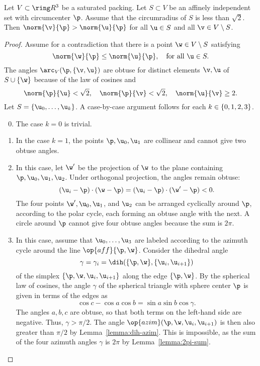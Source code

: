 \begin{cnl}
\figNOCHOTB %


\begin{lemma}[nondegeneracy]
\label{lemma:sqrt2-close} 
%
Let $V\subset\vecR{3}$ be a saturated packing.  Let $S\subset V$ be an
affinely independent set with circumcenter $\p$.  Assume that the
circumradius of $S$ is less than $\sqrt2$.  Then
$\norm{\v}{\p}>\norm{\u}{\p}$ for all $\u\in S$ and all $\v\in
V\setminus S$.
\end{lemma}


\begin{proof} 
Assume for a contradiction that 
there is a point $\w\in V\setminus S$ satisfying
\begin{equation}\label{eqn:closest} 
\norm{\w}{\p}\le \norm{ \u}{\p}, \quad\text{for all }  \u\in S.
\end{equation}
The angles $\arc_V(\p,\braced{\v, \u})$ are obtuse for distinct elements
$\v,\u$ of $ S\cup\braced{\w}$ because of the law of cosines and
\[  
\norm{\p}{\u} < \sqrt2,\quad \norm{\p}{ \v} <\sqrt2,\quad \norm{\u}{ \v} \ge 2.
\]  
Let $S=\setenumdots{\u}{0}{k}$.
A case-by-case argument follows for each $k\in\{0,1,2,3\}$.

\begin{enumerate}
\setcounter{enumi}{-1}
\item 
The case $k=0$ is trivial.
\item
  In the case $k=1$, the points $\p, \u_0, \u_1$ are collinear and
  cannot give two obtuse angles.
\item
In this case, let $\w'$ be the projection of $\w$ to
the plane containing $\p, \u_0, \u_1, \u_2$.  Under orthogonal
projection, the angles remain obtuse:
\[
(\u_i-\p)\cdot (\w-\p) = (\u_i-\p)\cdot (\w'-\p) <0.
\] 
The four points $\w', \u_0, \u_1$, and $\u_2$ can be arranged
cyclically around $\p$, according to the polar cycle, each forming an
obtuse angle with the next.  A circle around $\p$ cannot give four
obtuse angles because the sum is $2\pi$.
\item
In this case, assume that $ \u_0,\ldots, \u_3$ are labeled according to the azimuth
cycle
around the line $\op{aff}\braced{\p,\w}$.  Consider the dihedral angle
\[  
\gamma=\gamma_i=\dih(\braced{\p,\w},\braced{ \u_i, \u_{i+1}})
\] 
of the simplex $\braced{\p,\w,\u_i,\u_{i+1}}$ along the edge $\braced{\p,\w}$.
By the spherical law of cosines, the angle $\gamma$ of the
spherical triangle with sphere center $\p$ is given in terms of the edges as
\[  
\cos c - \cos a \cos b = \sin a \sin b \cos \gamma.
\] 
The angles $a,b,c$ are obtuse, so that both terms on the left-hand
side are negative. Thus, $\gamma>\pi/2$.  The  angle
$\op{azim}(\p,\w,\u_i,\u_{i+1})$ is then also greater than $\pi/2$ by
Lemma~\ref{lemma:dih-azim}.  This is impossible, as the sum of the
four azimuth angles $\gamma$ is $2\pi$ by Lemma~\ref{lemma:2pi-sum}.
\end{enumerate}
\end{proof}


\end{cnl}
